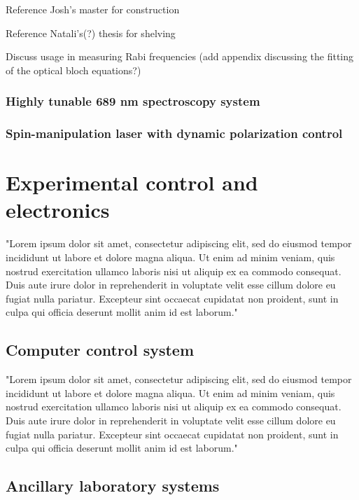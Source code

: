 Reference Josh's master for construction

Reference Natali's(?) thesis for shelving

Discuss usage in measuring Rabi frequencies (add appendix discussing the fitting of the optical bloch equations?)

\subsubsection{Highly tunable 689 nm spectroscopy system}

\subsubsection{Spin-manipulation laser with dynamic polarization control}

\section{Experimental control and electronics}
\label{sec:electronics}

"Lorem ipsum dolor sit amet, consectetur adipiscing elit, sed do eiusmod tempor incididunt ut labore et dolore magna aliqua. Ut enim ad minim veniam, quis nostrud exercitation ullamco laboris nisi ut aliquip ex ea commodo consequat. Duis aute irure dolor in reprehenderit in voluptate velit esse cillum dolore eu fugiat nulla pariatur. Excepteur sint occaecat cupidatat non proident, sunt in culpa qui officia deserunt mollit anim id est laborum."

\subsection{Computer control system}
\label{ssec:comp_sys}

"Lorem ipsum dolor sit amet, consectetur adipiscing elit, sed do eiusmod tempor incididunt ut labore et dolore magna aliqua. Ut enim ad minim veniam, quis nostrud exercitation ullamco laboris nisi ut aliquip ex ea commodo consequat. Duis aute irure dolor in reprehenderit in voluptate velit esse cillum dolore eu fugiat nulla pariatur. Excepteur sint occaecat cupidatat non proident, sunt in culpa qui officia deserunt mollit anim id est laborum."

\subsection{Ancillary laboratory systems}
\label{ssec:misc_sys}

